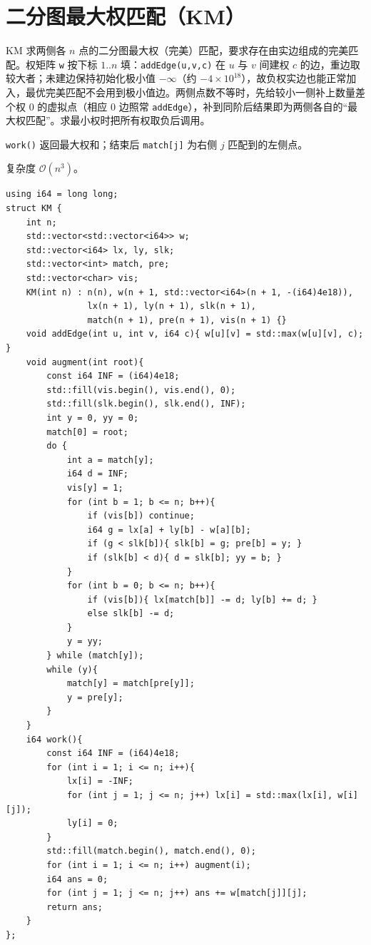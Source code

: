 \section{二分图最大权匹配（KM）}

KM 求两侧各 $n$ 点的二分图最大权（完美）匹配，要求存在由实边组成的完美匹配。权矩阵 \texttt{w} 按下标 $1..n$ 填：\verb|addEdge(u,v,c)| 在 $u$ 与 $v$ 间建权 $c$ 的边，重边取较大者；未建边保持初始化极小值 $-\infty$（约 $-4\times 10^{18}$），故负权实边也能正常加入，最优完美匹配不会用到极小值边。两侧点数不等时，先给较小一侧补上数量差个权 $0$ 的虚拟点（相应 $0$ 边照常 \verb|addEdge|），补到同阶后结果即为两侧各自的“最大权匹配”。求最小权时把所有权取负后调用。

\verb|work()| 返回最大权和；结束后 \verb|match[j]| 为右侧 $j$ 匹配到的左侧点。

复杂度 $\mathcal{O}(n^3)$。

\begin{lstlisting}
using i64 = long long;
struct KM {
    int n;
    std::vector<std::vector<i64>> w;
    std::vector<i64> lx, ly, slk;
    std::vector<int> match, pre;
    std::vector<char> vis;
    KM(int n) : n(n), w(n + 1, std::vector<i64>(n + 1, -(i64)4e18)),
                lx(n + 1), ly(n + 1), slk(n + 1),
                match(n + 1), pre(n + 1), vis(n + 1) {}
    void addEdge(int u, int v, i64 c){ w[u][v] = std::max(w[u][v], c); }
    void augment(int root){
        const i64 INF = (i64)4e18;
        std::fill(vis.begin(), vis.end(), 0);
        std::fill(slk.begin(), slk.end(), INF);
        int y = 0, yy = 0;
        match[0] = root;
        do {
            int a = match[y];
            i64 d = INF;
            vis[y] = 1;
            for (int b = 1; b <= n; b++){
                if (vis[b]) continue;
                i64 g = lx[a] + ly[b] - w[a][b];
                if (g < slk[b]){ slk[b] = g; pre[b] = y; }
                if (slk[b] < d){ d = slk[b]; yy = b; }
            }
            for (int b = 0; b <= n; b++){
                if (vis[b]){ lx[match[b]] -= d; ly[b] += d; }
                else slk[b] -= d;
            }
            y = yy;
        } while (match[y]);
        while (y){
            match[y] = match[pre[y]];
            y = pre[y];
        }
    }
    i64 work(){
        const i64 INF = (i64)4e18;
        for (int i = 1; i <= n; i++){
            lx[i] = -INF;
            for (int j = 1; j <= n; j++) lx[i] = std::max(lx[i], w[i][j]);
            ly[i] = 0;
        }
        std::fill(match.begin(), match.end(), 0);
        for (int i = 1; i <= n; i++) augment(i);
        i64 ans = 0;
        for (int j = 1; j <= n; j++) ans += w[match[j]][j];
        return ans;
    }
};
\end{lstlisting}
